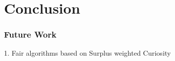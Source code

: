 \section{Conclusion}

\subsubsection{Future Work}
1. Fair algorithms based on Surplus weighted Curiosity
